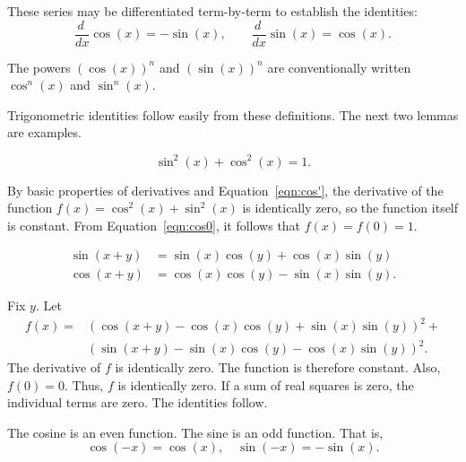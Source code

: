 These series may be differentiated term-by-term to establish the identities:
    \begin{equation}\label{eqn:cos'}
    \frac{d\phantom{~}} {dx}\cos(x) = -\sin(x),\qquad \frac{ d\phantom{~} }{dx}\sin(x) = \cos(x).
    \end{equation}

The powers $(\cos(x))^n$ and $(\sin(x))^n$ are conventionally written
$\cos^n(x)$ and $\sin^n(x)$.

Trigonometric identities follow easily from these definitions.  The next two lemmas are examples.

\begin{lemma}\label{lemma:circle} 
   $$\sin^2(x) + \cos^2(x) = 1.$$
\end{lemma}

\begin{proved}
By basic properties of derivatives and Equation~\ref{eqn:cos'},
the derivative of the function $f(x) = \cos^2(x) +\sin^2(x)$ is
identically zero, so the function itself is constant.  From
Equation~\ref{eqn:cos0}, it follows that $f(x)=f(0)=1$.
\swallowed\end{proved}


\begin{lemma}\label{lemma:sin-add}
  $$\begin{array}{lll}
  \sin(x+y) &= \sin(x)\cos(y) + \cos(x)\sin(y)\\
  \cos(x+y)  &= \cos(x)\cos(y) - \sin(x)\sin(y).
  \end{array}$$
\end{lemma}

\begin{proved}
Fix $y$.  Let
    $$\begin{array}{lll}
    f(x) = &(\cos(x+y) - \cos(x)\cos(y) +
    \sin(x)\sin(y))^2 +\\ & (\sin(x+y) -\sin(x)\cos(y) -
    \cos(x)\sin(y))^2.
    \end{array}$$
The derivative of $f$ is identically zero.  The function is
therefore constant. Also, $f(0)=0$.  Thus, $f$ is identically zero.
If a sum of real squares is zero, the individual terms are zero. The
identities follow.
\swallowed\end{proved}

\begin{lemma}\label{lemma:cos-neg}
The cosine is an even function.  The sine is an odd
function.  That is,
    $$\cos(-x) = \cos(x),\quad\sin(-x) = -\sin(x).$$
\end{lemma}



